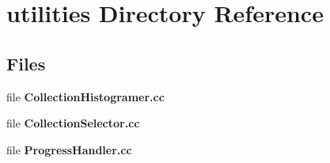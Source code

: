 \section{utilities Directory Reference}
\label{dir_c570191454b6ed749bbbbe882647292b}
\subsection*{Files}
\begin{DoxyCompactItemize}
\item 
file {\bfseries Collection\-Histogramer.\-cc}
\item 
file {\bfseries Collection\-Selector.\-cc}
\item 
file {\bfseries Progress\-Handler.\-cc}
\end{DoxyCompactItemize}
